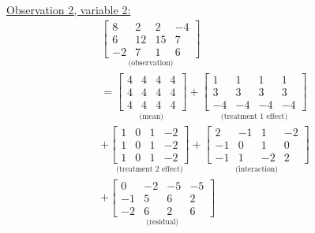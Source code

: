 \begin{enumerate}[label= (\alph*)]
    \underline{Observation 2, variable 2:}
    \begin{multline*}
        \underset{\text{(observation)}}{
            \left[
                \begin{array}{rrrr}
                     8 &  2 &   2 & -4 \\
                     6 & 12 &  15 &  7 \\
                    -2 &  7 &   1 &  6
                \end{array}
            \right]
        }
        \\
        =
        \underset{\text{(mean)}}{
            \left[
                \begin{array}{rrrr}
                    4 & 4 & 4 & 4 \\
                    4 & 4 & 4 & 4 \\
                    4 & 4 & 4 & 4
                \end{array}
            \right]
        }
        +
        \underset{\text{(treatment 1 effect)}}{
            \left[
                \begin{array}{rrrr}
                     1 &  1 &  1 &  1 \\
                     3 &  3 &  3 &  3 \\
                    -4 & -4 & -4 & -4 
                \end{array}
            \right]
        }
        \\
        +
        \underset{\text{(treatment 2 effect)}}{
            \left[
                \begin{array}{rrrr}
                    1 & 0 & 1 & -2 \\
                    1 & 0 & 1 & -2 \\
                    1 & 0 & 1 & -2
                \end{array}
            \right]
        }
        +
        \underset{\text{(interaction)}}{
            \left[
                \begin{array}{rrrr}
                     2 & -1 &  1 & -2 \\
                    -1 &  0 &  1 &  0 \\
                    -1 &  1 & -2 &  2
                \end{array}
            \right]
        }
        \\
        +
        \underset{\text{(residual)}}{
            \left[
                \begin{array}{rrrr}
                     0 & -2 & -5 & -5 \\
                    -1 &  5 &  6 &  2 \\
                    -2 &  6 &  2 &  6
                \end{array}
            \right]
        }
    \end{multline*}


\end{enumerate}
